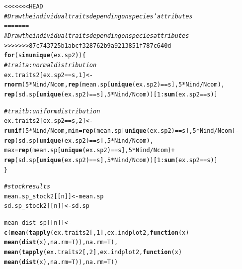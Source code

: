 \documentclass[12pt]{article}\usepackage[]{graphicx}\usepackage[]{color}
\makeatletter
\newcommand{\hlnum}[1]{\textcolor[rgb]{0.686,0.059,0.569}{#1}}%
\newcommand{\hlcom}[1]{\textcolor[rgb]{0.678,0.584,0.686}{\textit{#1}}}%
\newcommand{\hlopt}[1]{\textcolor[rgb]{0,0,0}{#1}}%
\newcommand{\hlstd}[1]{\textcolor[rgb]{0.345,0.345,0.345}{#1}}%
\newcommand{\hlkwa}[1]{\textcolor[rgb]{0.161,0.373,0.58}{\textbf{#1}}}%
\newcommand{\hlkwb}[1]{\textcolor[rgb]{0.69,0.353,0.396}{#1}}%
\newcommand{\hlkwc}[1]{\textcolor[rgb]{0.333,0.667,0.333}{#1}}%
\newcommand{\hlkwd}[1]{\textcolor[rgb]{0.737,0.353,0.396}{\textbf{#1}}}%
\newenvironment{kframe}{%
 \def\at@end@of@kframe{}%
 \ifinner\ifhmode%
  \def\at@end@of@kframe{\end{minipage}}%
  \begin{minipage}{\columnwidth}%
 \fi\fi%
 \def\FrameCommand##1{\hskip\@totalleftmargin \hskip-\fboxsep
 \colorbox{shadecolor}{##1}\hskip-\fboxsep
     \hskip-\linewidth \hskip-\@totalleftmargin \hskip\columnwidth}%
 \MakeFramed {\advance\hsize-\width
   \@totalleftmargin\z@ \linewidth\hsize
   \@setminipage}}%
 {\par\unskip\endMakeFramed%
 \at@end@of@kframe}
\newenvironment{knitrout}{}{} %
\makeatother
\begin{document}
\begin{landscape}
\begin{knitrout}
\begin{kframe}
\begin{alltt}
<<<<<<< HEAD
 \hlcom{# Draw the individual traits depending on species' attributes}
=======
 \hlcom{# Draw the individual traits depending on species attributes}
>>>>>>> 87c743725b1abcf328762b9a9213851f787c640d
  \hlkwa{for}\hlstd{(s} \hlkwa{in} \hlkwd{unique}\hlstd{(ex.sp2))\{}
   \hlcom{#trait a : normal distribution}
   \hlstd{ex.traits2[ex.sp2} \hlopt{==} \hlstd{s,} \hlnum{1}\hlstd{]} \hlkwb{<-}
   \hlkwd{rnorm}\hlstd{(}\hlnum{5}\hlopt{*}\hlstd{Nind}\hlopt{/}\hlstd{Ncom,} \hlkwd{rep}\hlstd{(mean.sp[}\hlkwd{unique}\hlstd{(ex.sp2)} \hlopt{==} \hlstd{s],} \hlnum{5}\hlopt{*}\hlstd{Nind}\hlopt{/}\hlstd{Ncom),}
         \hlkwd{rep}\hlstd{(sd.sp[}\hlkwd{unique}\hlstd{(ex.sp2)} \hlopt{==} \hlstd{s],} \hlnum{5}\hlopt{*}\hlstd{Nind}\hlopt{/}\hlstd{Ncom))[}\hlnum{1}\hlopt{:}\hlkwd{sum}\hlstd{(ex.sp2} \hlopt{==} \hlstd{s)]}

   \hlcom{#trait b : uniform distribution}
   \hlstd{ex.traits2[ex.sp2} \hlopt{==} \hlstd{s,} \hlnum{2}\hlstd{]} \hlkwb{<-}
   \hlkwd{runif}\hlstd{(}\hlnum{5}\hlopt{*}\hlstd{Nind}\hlopt{/}\hlstd{Ncom,} \hlkwc{min} \hlstd{=} \hlkwd{rep}\hlstd{(mean.sp[}\hlkwd{unique}\hlstd{(ex.sp2)} \hlopt{==} \hlstd{s],} \hlnum{5}\hlopt{*}\hlstd{Nind}\hlopt{/}\hlstd{Ncom)} \hlopt{-}
         \hlkwd{rep}\hlstd{(sd.sp[}\hlkwd{unique}\hlstd{(ex.sp2)} \hlopt{==} \hlstd{s],} \hlnum{5}\hlopt{*}\hlstd{Nind}\hlopt{/}\hlstd{Ncom),}
         \hlkwc{max} \hlstd{=} \hlkwd{rep}\hlstd{(mean.sp[}\hlkwd{unique}\hlstd{(ex.sp2)} \hlopt{==} \hlstd{s],} \hlnum{5}\hlopt{*}\hlstd{Nind}\hlopt{/}\hlstd{Ncom)} \hlopt{+}
         \hlkwd{rep}\hlstd{(sd.sp[}\hlkwd{unique}\hlstd{(ex.sp2)} \hlopt{==} \hlstd{s],} \hlnum{5}\hlopt{*}\hlstd{Nind}\hlopt{/}\hlstd{Ncom))[}\hlnum{1}\hlopt{:}\hlkwd{sum}\hlstd{(ex.sp2} \hlopt{==} \hlstd{s)]}
  \hlstd{\}}

 \hlcom{#stock results}
 \hlstd{mean.sp_stock2[[n]]} \hlkwb{<-} \hlstd{mean.sp}
 \hlstd{sd.sp_stock2[[n]]} \hlkwb{<-} \hlstd{sd.sp}

 \hlstd{mean_dist_sp[[n]]} \hlkwb{<-} \hlkwd{c}\hlstd{(}\hlkwd{mean}\hlstd{(}\hlkwd{tapply}\hlstd{(ex.traits2[,} \hlnum{1}\hlstd{], ex.indplot2,} \hlkwa{function}\hlstd{(}\hlkwc{x}\hlstd{)}
                                    \hlkwd{mean}\hlstd{(}\hlkwd{dist}\hlstd{(x),} \hlkwc{na.rm}\hlstd{=T)),} \hlkwc{na.rm}\hlstd{=T),}
                        \hlkwd{mean}\hlstd{(}\hlkwd{tapply}\hlstd{(ex.traits2[,} \hlnum{2}\hlstd{], ex.indplot2,} \hlkwa{function}\hlstd{(}\hlkwc{x}\hlstd{)}
                                    \hlkwd{mean}\hlstd{(}\hlkwd{dist}\hlstd{(x),} \hlkwc{na.rm}\hlstd{=T)),} \hlkwc{na.rm}\hlstd{=T))}


\end{alltt}
\end{kframe}
\end{knitrout}
\end{landscape}
\end{document}

